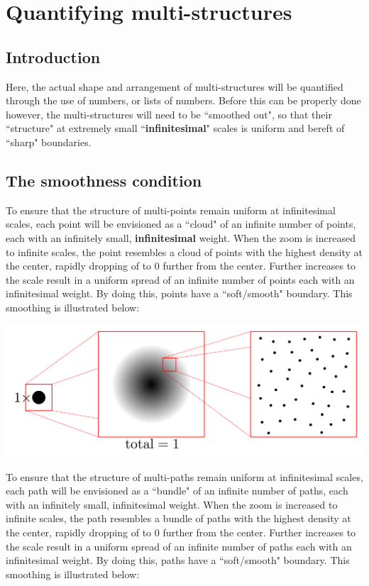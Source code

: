 


\chapter{Quantifying multi-structures}\label{chapter:quantifying_multi-structures}

\section{Introduction}

Here, the actual shape and arrangement of multi-structures will be quantified through the use of numbers, or lists of numbers. Before this can be properly done however, the multi-structures will need to be ``smoothed out", so that their ``structure" at extremely small ``{\bf infinitesimal}" scales is uniform and bereft of ``sharp" boundaries.

\section{The smoothness condition}

To ensure that the structure of multi-points remain uniform at infinitesimal scales, each point will be envisioned as a ``cloud" of an infinite number of points, each with an infinitely small, {\bf infinitesimal} weight. When the zoom is increased to infinite scales, the point resembles a cloud of points with the highest density at the center, rapidly dropping of to \(0\) further from the center. Further increases to the scale result in a uniform spread of an infinite number of points each with an infinitesimal weight. By doing this, points have a ``soft/smooth" boundary. This smoothing is illustrated below:

\begin{center}
\includegraphics[width = \textwidth]{Smoothness_and_duality/point_smoothing}
\end{center}

To ensure that the structure of multi-paths remain uniform at infinitesimal scales, each path will be envisioned as a ``bundle" of an infinite number of paths, each with an infinitely small, infinitesimal weight. When the zoom is increased to infinite scales, the path resembles a bundle of paths with the highest density at the center, rapidly dropping of to \(0\) further from the center. Further increases to the scale result in a uniform spread of an infinite number of paths each with an infinitesimal weight. By doing this, paths have a ``soft/smooth" boundary. This smoothing is illustrated below:

